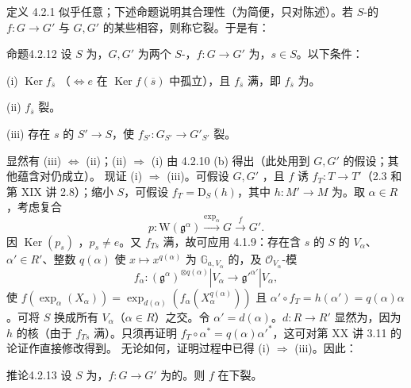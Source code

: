 定义 4.2.1 似乎任意；下述命题说明其合理性（为简便，只对陈述）。若 $S$-的 $f:G\to G'$ 与 $G,G'$ 的某些相容，则称它裂。于是有：
\begin{SGAresult}{命题}{4.2.12} 设 $S$ 为，$G,G'$ 为两个 $S$-，$f:G\to G'$ 为，$s\in S$。以下条件：

(i) $\operatorname{Ker}f_{\overline s}$ （$\Leftrightarrow e$ 在 $\operatorname{Ker}f(\overline s)$ 中孤立），且 $f_{\overline s}$ 满，即 $f_{\overline s}$ 为。

(ii) $f_{\overline s}$ 裂。

(iii) 存在 $s$ 的 $S'\to S$，使 $f_{S'}:G_{S'}\to G'_{S'}$ 裂。
\end{SGAresult}
显然有 (iii) $\Leftrightarrow$ (ii)；(ii) $\Rightarrow$ (i) 由 4.2.10 (b) 得出（此处用到 $G,G'$ 的假设；其他蕴含对仍成立）。
现证 (i) $\Rightarrow$ (iii)。可假设 $G,G'$ ，且 $f$ 诱 $f_T:T\to T'$（2.3 和第 XIX 讲 2.8）；缩小 $S$，可假设 $f_T=\mathrm D_S(h)$，其中 $h:M'\to M$ 为。取 $\alpha\in R$，考虑复合
\[p:\mathrm W(\mathfrak g^\alpha)\xrightarrow{\exp_\alpha}G\xrightarrow{f}G'.\]
因 $\operatorname{Ker}(p_s)$ ，$p_s\ne e$。又 $f_{Ts}$ 满，故可应用 4.1.9：存在含 $s$ 的 $S$ 的 $V_\alpha$、 $\alpha'\in R'$、整数 $q(\alpha)$ 使 $x\mapsto x^{q(\alpha)}$ 为 $\mathbb G_{a,V_\alpha}$ 的，及 $\mathcal O_{V_\alpha}$-模
\[f_\alpha:(\mathfrak g^\alpha)^{\otimes q(\alpha)}|V_\alpha\longrightarrow\mathfrak g'^{\alpha'}|V_\alpha,\]
使 $f(\exp_\alpha(X_\alpha))=\exp_{d(\alpha)}(f_\alpha(X_\alpha^{q(\alpha)}))$ 且 $\alpha'\circ f_T=h(\alpha')=q(\alpha)\alpha$。可将 $S$ 换成所有 $V_\alpha$（$\alpha\in R$）之交。令 $\alpha'=d(\alpha)$。$d:R\to R'$ 显然为，因为 $h$ 的核（由于 $f_{Ts}$ 满）。只须再证明
$f_T\circ\alpha^*=q(\alpha)\alpha'^*$，这可对第 XX 讲 3.11 的论证作直接修改得到。
无论如何，证明过程中已得 (i) $\Rightarrow$ (iii)。因此：
\begin{SGAresult}{推论}{4.2.13} 设 $S$ 为，$f:G\to G'$ 为的。则 $f$ 在下裂。\end{SGAresult}

